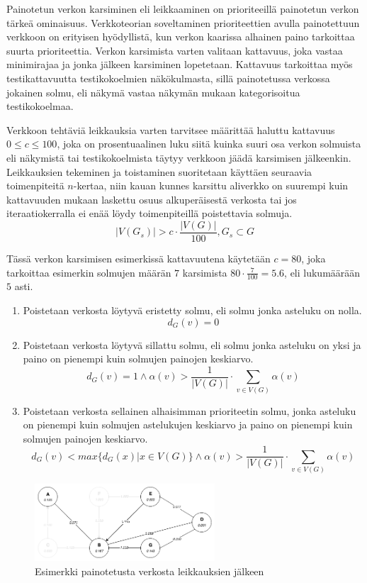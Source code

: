   Painotetun verkon karsiminen eli leikkaaminen on prioriteeillä painotetun verkon tärkeä ominaisuus.
  Verkkoteorian soveltaminen prioriteettien avulla painotettuun verkkoon on erityisen hyödyllistä, kun verkon kaarissa alhainen paino tarkoittaa suurta prioriteettia.
  Verkon karsimista varten valitaan kattavuus, joka vastaa minimirajaa ja jonka jälkeen karsiminen lopetetaan.
  Kattavuus tarkoittaa myös testikattavuutta testikokoelmien näkökulmasta, sillä painotetussa verkossa jokainen solmu, eli näkymä vastaa näkymän mukaan kategorisoitua testikokoelmaa.

  Verkkoon tehtäviä leikkauksia varten tarvitsee määrittää haluttu kattavuus \(0 \leq c \leq 100\), joka on prosentuaalinen luku siitä kuinka suuri osa verkon solmuista eli näkymistä tai testikokoelmista täytyy verkkoon jäädä karsimisen jälkeenkin. Leikkauksien tekeminen ja toistaminen suoritetaan käyttäen seuraavia toimenpiteitä \(n\)-kertaa, niin kauan kunnes karsittu aliverkko on suurempi kuin kattavuuden mukaan laskettu osuus alkuperäisestä verkosta tai jos iteraatiokerralla ei enää löydy toimenpiteillä poistettavia solmuja.
  \[|V(G_s)| > c \cdot \frac{|V(G)|}{100}, G_s \subset G\]

  Tässä verkon karsimisen esimerkissä kattavuutena käytetään \(c = 80\), joka tarkoittaa esimerkin solmujen määrän \(7\) karsimista \(80 \cdot \frac{7}{100} = 5.6\), eli lukumäärään \(5\) asti.

  \begin{enumerate}
    \item Poistetaan verkosta löytyvä eristetty solmu, eli solmu jonka asteluku on nolla.
    \[d_G(v) = 0\]
    \item Poistetaan verkosta löytyvä sillattu solmu, eli solmu jonka asteluku on yksi ja paino on pienempi kuin solmujen painojen keskiarvo.
    \[d_G(v) = 1  \land \alpha(v) > \frac{1}{|V(G)|} \cdot \sum\limits_{v \in V(G)} \alpha(v)\]
    \item Poistetaan verkosta sellainen alhaisimman prioriteetin solmu, jonka asteluku on pienempi kuin solmujen astelukujen keskiarvo ja paino on pienempi kuin solmujen painojen keskiarvo.
    \[d_G(v) < max\{d_G(x) | x \in V(G)\} \land \alpha(v) > \frac{1}{|V(G)|} \cdot \sum\limits_{v \in V(G)} \alpha(v)\]
  \end{enumerate}

  \begin{figure}[H]
    \centering
    \includegraphics[width=0.6\textwidth]{assets/painotettu-verkko-jalkeen.png}
    \caption{Esimerkki painotetusta verkosta leikkauksien jälkeen}
    \label{fig:painotettu-verkko-jalkeen}
  \end{figure}


